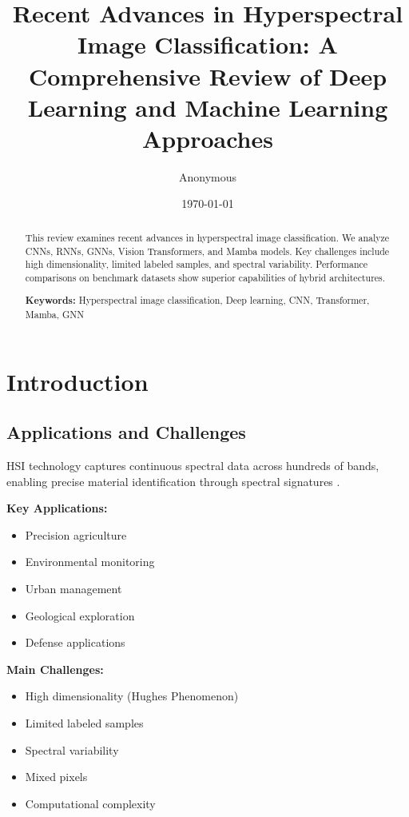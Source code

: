 \documentclass[12pt,a4paper]{article}
\title{Recent Advances in Hyperspectral Image Classification: A Comprehensive Review of Deep Learning and Machine Learning Approaches}
\author{Anonymous}
\date{\today}
\begin{document}
\maketitle

\begin{abstract}
This review examines recent advances in hyperspectral image classification. We analyze CNNs, RNNs, GNNs, Vision Transformers, and Mamba models. Key challenges include high dimensionality, limited labeled samples, and spectral variability. Performance comparisons on benchmark datasets show superior capabilities of hybrid architectures.

\textbf{Keywords:} Hyperspectral image classification, Deep learning, CNN, Transformer, Mamba, GNN
\end{abstract}

\section{Introduction}

\subsection{Applications and Challenges}

HSI technology captures continuous spectral data across hundreds of bands, enabling precise material identification through spectral signatures \cite{hong2020more, paoletti2019deep}.

\textbf{Key Applications:}
\begin{itemize}
\item Precision agriculture \cite{gewali2018machine}
\item Environmental monitoring \cite{gewali2018machine}
\item Urban management \cite{li2013hyperspectral}
\item Geological exploration \cite{roy2019hybridSN}
\item Defense applications \cite{roy2019hybridSN}
\end{itemize}

\textbf{Main Challenges:}
\begin{itemize}
\item High dimensionality (Hughes Phenomenon)
\item Limited labeled samples
\item Spectral variability
\item Mixed pixels
\item Computational complexity
\end{itemize}
\end{document}
